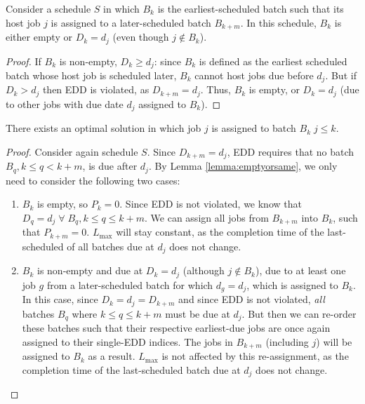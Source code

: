 \documentclass[oribibl]{llncs}
\def\Lmax{{L_{\mathrm{max}}}}
\begin{document}
\begin{lemma}
  \label{lemma:emptyorsame}
Consider a schedule $S$ in which $B_k$ is the earliest-scheduled batch such that its
host job $j$ is assigned to a later-scheduled batch $B_{k+m}$. In this schedule,
$B_k$ is either empty or $D_k = d_j$ (even though $j \notin B_k$).
\end{lemma}
\begin{proof}
If $B_k$ is non-empty, $D_k \geq d_j$: since $B_k$ is defined as
the earliest scheduled batch whose host job is scheduled later, $B_k$ cannot
host jobs due before $d_j$. But if $D_k > d_j$ then EDD is violated, as $D_{k+m}
= d_j$. Thus, $B_k$ is empty, or $D_k = d_j$ (due to other jobs with due date $d_j$ assigned to
$B_k$).
\end{proof}

\begin{proposition} \label{prop:movebackonly}
There exists an optimal solution in which job $j$ is assigned to batch
$B_k \; j \leq k$.
\end{proposition}



\begin{proof}
  Consider again schedule $S$. Since $D_{k+m} = d_j$, EDD requires that no batch $B_q,
  k\leq q<k+m$, is due after $d_j$. By Lemma \ref{lemma:emptyorsame}, we only
  need to consider the following two cases:

  \begin{enumerate}
    \item{$B_k$ is empty, so $P_k = 0$. Since EDD is not violated, we
    know that $D_q = d_j\;\forall\;B_q, k \leq q \leq k+m$. We can assign all jobs from $B_{k+m}$ into $B_k$, such that
    $P_{k+m} = 0$. $\Lmax$ will stay constant, as the completion time of
    the last-scheduled of all batches due at $d_j$ does not change.}
    \item{$B_k$ is non-empty and due at $D_k = d_j$ (although $j \notin B_k$), due
        to at least one job $g$ from a later-scheduled batch for which
        $d_g = d_j$, which is assigned to $B_k$. In this case, since $D_k
        = d_j = D_{k+m}$ and since EDD is not violated, \textit{all} batches $B_q$
        where $k \leq q \leq k+m$ must be due at $d_j$. But then we can re-order
        these batches such that their respective earliest-due jobs are once
        again assigned to their single-EDD indices. The jobs in $B_{k+m}$
        (including $j$) will be assigned to $B_k$ as a result. $\Lmax$
    is not affected by this re-assignment, as the completion time of the
    last-scheduled batch due
  at $d_j$ does not change.}
  \end{enumerate} \end{proof}
\end{document}
